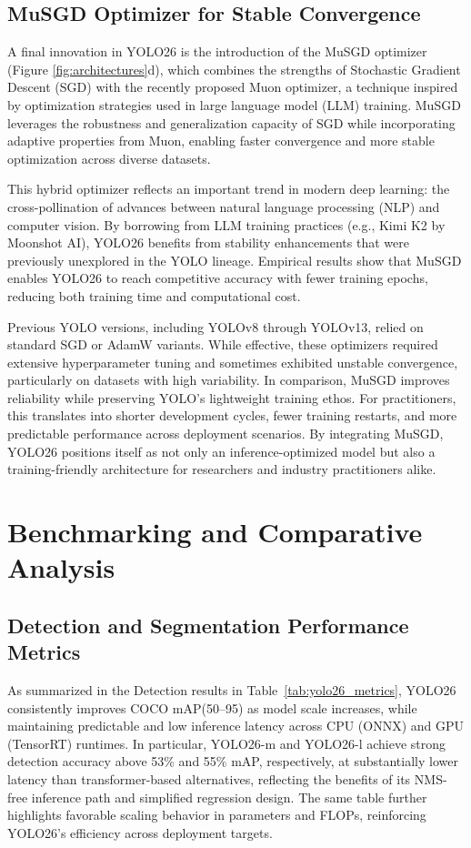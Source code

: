 \documentclass{article}
\begin{document}
\subsection{MuSGD Optimizer for Stable Convergence}

A final innovation in YOLO26 is the introduction of the MuSGD optimizer (Figure \ref{fig:architectures}d), which combines the strengths of Stochastic Gradient Descent (SGD) with the recently proposed Muon optimizer, a technique inspired by optimization strategies used in large language model (LLM) training. MuSGD leverages the robustness and generalization capacity of SGD while incorporating adaptive properties from Muon, enabling faster convergence and more stable optimization across diverse datasets.  

This hybrid optimizer reflects an important trend in modern deep learning: the cross-pollination of advances between natural language processing (NLP) and computer vision. By borrowing from LLM training practices (e.g., Kimi K2 by Moonshot AI), YOLO26 benefits from stability enhancements that were previously unexplored in the YOLO lineage. Empirical results show that MuSGD enables YOLO26 to reach competitive accuracy with fewer training epochs, reducing both training time and computational cost.  

Previous YOLO versions, including YOLOv8 through YOLOv13, relied on standard SGD or AdamW variants. While effective, these optimizers required extensive hyperparameter tuning and sometimes exhibited unstable convergence, particularly on datasets with high variability. In comparison, MuSGD improves reliability while preserving YOLO’s lightweight training ethos. For practitioners, this translates into shorter development cycles, fewer training restarts, and more predictable performance across deployment scenarios. By integrating MuSGD, YOLO26 positions itself as not only an inference-optimized model but also a training-friendly architecture for researchers and industry practitioners alike.


\section{Benchmarking and Comparative Analysis}

\subsection{Detection and Segmentation Performance Metrics}
As summarized in the Detection results in Table~\ref{tab:yolo26_metrics}, YOLO26 consistently improves COCO mAP(50–95) as model scale increases, while maintaining predictable and low inference latency across CPU (ONNX) and GPU (TensorRT) runtimes. In particular, YOLO26-m and YOLO26-l achieve strong detection accuracy above 53\% and 55\% mAP, respectively, at substantially lower latency than transformer-based alternatives, reflecting the benefits of its NMS-free inference path and simplified regression design. The same table further highlights favorable scaling behavior in parameters and FLOPs, reinforcing YOLO26’s efficiency across deployment targets. 
\end{document}
